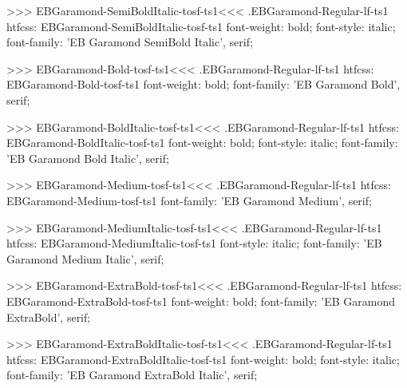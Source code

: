 {{{{{{{>>>
\<EBGaramond-SemiBoldItalic-tosf-ts1\><<<
.EBGaramond-Regular-lf-ts1
htfcss:  EBGaramond-SemiBoldItalic-tosf-ts1  font-weight: bold; font-style: italic; font-family: 'EB Garamond SemiBold Italic', serif;

>>>
\<EBGaramond-Bold-tosf-ts1\><<<
.EBGaramond-Regular-lf-ts1
htfcss:  EBGaramond-Bold-tosf-ts1  font-weight: bold; font-family: 'EB Garamond Bold', serif;

>>>
\<EBGaramond-BoldItalic-tosf-ts1\><<<
.EBGaramond-Regular-lf-ts1
htfcss:  EBGaramond-BoldItalic-tosf-ts1  font-weight: bold; font-style: italic; font-family: 'EB Garamond Bold Italic', serif;

>>>
\<EBGaramond-Medium-tosf-ts1\><<<
.EBGaramond-Regular-lf-ts1
htfcss:  EBGaramond-Medium-tosf-ts1  font-family: 'EB Garamond Medium', serif;

>>>
\<EBGaramond-MediumItalic-tosf-ts1\><<<
.EBGaramond-Regular-lf-ts1
htfcss:  EBGaramond-MediumItalic-tosf-ts1  font-style: italic; font-family: 'EB Garamond Medium Italic', serif;

>>>
\<EBGaramond-ExtraBold-tosf-ts1\><<<
.EBGaramond-Regular-lf-ts1
htfcss:  EBGaramond-ExtraBold-tosf-ts1  font-weight: bold; font-family: 'EB Garamond ExtraBold', serif;

>>>
\<EBGaramond-ExtraBoldItalic-tosf-ts1\><<<
.EBGaramond-Regular-lf-ts1
htfcss:  EBGaramond-ExtraBoldItalic-tosf-ts1  font-weight: bold; font-style: italic; font-family: 'EB Garamond ExtraBold Italic', serif;

}}}}}}}
